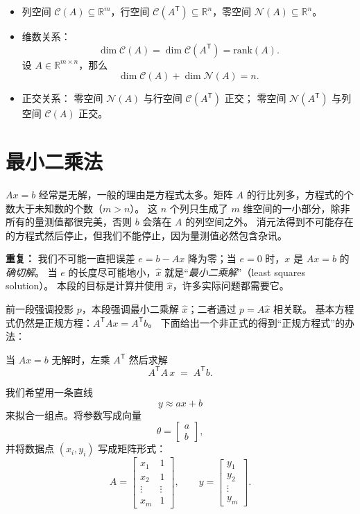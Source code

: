 \begin{proposition}[三者对比]
\begin{itemize}
  \item 列空间 $\mathcal{C}(A) \subseteq \mathbb{R}^m$，行空间 $\mathcal{C}(A^{\mathsf T}) \subseteq \mathbb{R}^n$，零空间 $\mathcal{N}(A) \subseteq \mathbb{R}^n$。
  \item 维数关系：
  \[
  \dim \mathcal{C}(A) = \dim \mathcal{C}(A^{\mathsf T}) = \mathrm{rank}(A).
  \]
  设 $A \in \mathbb{R}^{m\times n}$，那么
\[
\dim \mathcal{C}(A) + \dim \mathcal{N}(A) = n.
\]
  \item 正交关系：  
  零空间 $\mathcal{N}(A)$ 与行空间 $\mathcal{C}(A^{\mathsf T})$ 正交；  
  零空间 $\mathcal{N}(A^{\mathsf T})$ 与列空间 $\mathcal{C}(A)$ 正交。
\end{itemize}
\end{proposition}





\section{最小二乘法}
$Ax=b$ 经常是无解，一般的理由是方程式太多。矩阵 $A$ 的行比列多，方程式的个数大于未知数的个数（$m>n$）。
这 $n$ 个列只生成了 $m$ 维空间的一小部分，除非所有的量测值都很完美，否则 $b$ 会落在 $A$ 的列空间之外。
消元法得到不可能存在的方程式然后停止，但我们不能停止，因为量测值必然包含杂讯。

\textbf{重复：} 我们不可能一直把误差 $e=b-Ax$ 降为零；当 $e=0$ 时，$x$ 是 $Ax=b$ 的\emph{确切解}。
当 $e$ 的长度尽可能地小，$\hat{x}$ 就是“\emph{最小二乘解}”（least squares solution）。
本段的目标是计算并使用 $\hat{x}$，许多实际问题都需要它。

前一段强调投影 $p$，本段强调最小二乘解 $\hat{x}$；二者通过 $p=A\hat{x}$ 相关联。
基本方程式仍然是正规方程：$A^{\mathsf T} A x = A^{\mathsf T} b$。
下面给出一个非正式的得到“正规方程式”的办法：

\begin{note}
当 $Ax=b$ 无解时，左乘 $A^{\mathsf T}$ 然后求解
\[
A^{\mathsf T}A\,x \;=\; A^{\mathsf T}b .
\]
\end{note}
我们希望用一条直线
\[
y \approx ax + b
\]
来拟合一组点。将参数写成向量
\[
\theta = 
\begin{bmatrix}
a \\[4pt] b
\end{bmatrix},
\]
并将数据点 $(x_i,y_i)$ 写成矩阵形式：
\[
A =
\begin{bmatrix}
x_1 & 1 \\
x_2 & 1 \\
\vdots & \vdots \\
x_m & 1
\end{bmatrix},
\qquad
y =
\begin{bmatrix}
y_1 \\ y_2 \\ \vdots \\ y_m
\end{bmatrix}.
\]

